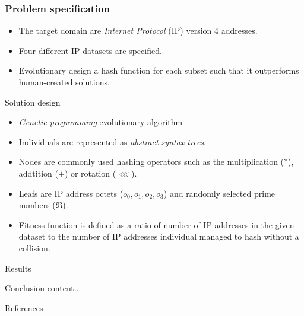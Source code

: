 \documentclass[11pt]{beamer}
\begin{document}
	\begin{frame}
		\frametitle{Problem specification}
		\begin{itemize}[<+->]
				\item The target domain are \textit{Internet Protocol} (IP) version 4 addresses.
				\item Four different IP datasets are specified.
				\item Evolutionary design a hash function for each subset such that it outperforms
					human-created solutions.
		\end{itemize}
	\end{frame}
	\begin{frame}{Solution design}
			\begin{itemize} [<+->]
				\item \textit{Genetic programming} evolutionary algorithm
				\item Individuals are represented as \textit{abstract syntax trees}.
				\item Nodes are commonly used hashing operators such as the multiplication ($*$), addtition ($+$) or rotation ($\lll$).
				\item Leafs are IP address octets ($o_0, o_1, o_2, o_3$) and randomly selected prime numbers ($\Re$).
				\item Fitness function is defined as a ratio of number of IP addresses in the given dataset to the number of IP addresses
					individual managed to hash without a collision.
			\end{itemize}
	\end{frame}
	\begin{frame}{Results}
		
	\end{frame}
	\begin{frame}{Conclusion}
		content...
	\end{frame}
	\begin{frame}{References}
		
	\end{frame}
\end{document}
